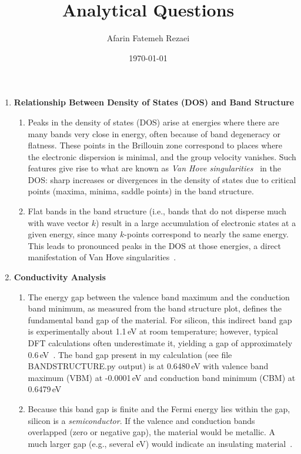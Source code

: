 \documentclass{article}
\begin{document}
	
\title{Analytical Questions}
\author{Afarin Fatemeh Rezaei}
\date{\today}
\maketitle

	
\begin{enumerate}
	\item \textbf{Relationship Between Density of States (DOS) and Band Structure}
	\begin{enumerate}
		\item
		Peaks in the density of states (DOS) arise at energies where there are many bands very close in energy, often because of band degeneracy or flatness. These points in the Brillouin zone correspond to places where the electronic dispersion is minimal, and the group velocity vanishes. Such features give rise to what are known as \emph{Van Hove singularities}~\cite{vanhove} in the DOS: sharp increases or divergences in the density of states due to critical points (maxima, minima, saddle points) in the band structure.
		\item
		Flat bands in the band structure (i.e., bands that do not disperse much with wave vector \( k \)) result in a large accumulation of electronic states at a given energy, since many \( k \)-points correspond to nearly the same energy. This leads to pronounced peaks in the DOS at those energies, a direct manifestation of Van Hove singularities~\cite{ashcroft_mermin,martin}.
	\end{enumerate}
	
	\item \textbf{Conductivity Analysis}
	\begin{enumerate}
		\item
		The energy gap between the valence band maximum and the conduction band minimum, as measured from the band structure plot, defines the fundamental band gap of the material. For silicon, this indirect band gap is experimentally about 1.1\,eV at room temperature; however, typical DFT calculations often underestimate it, yielding a gap of approximately 0.6\,eV~\cite{kittel}. The band gap present in my calculation (see file BANDSTRUCTURE.py output) is at 0.6480\,eV with valence band maximum (VBM) at -0.0001\,eV and
		conduction band minimum (CBM) at 0.6479\,eV
		\item
		Because this band gap is finite and the Fermi energy lies within the gap, silicon is a \emph{semiconductor}. If the valence and conduction bands overlapped (zero or negative gap), the material would be metallic. A much larger gap (e.g., several eV) would indicate an insulating material~\cite{ashcroft_mermin}.
	\end{enumerate}
	

\end{enumerate}
\end{document}
